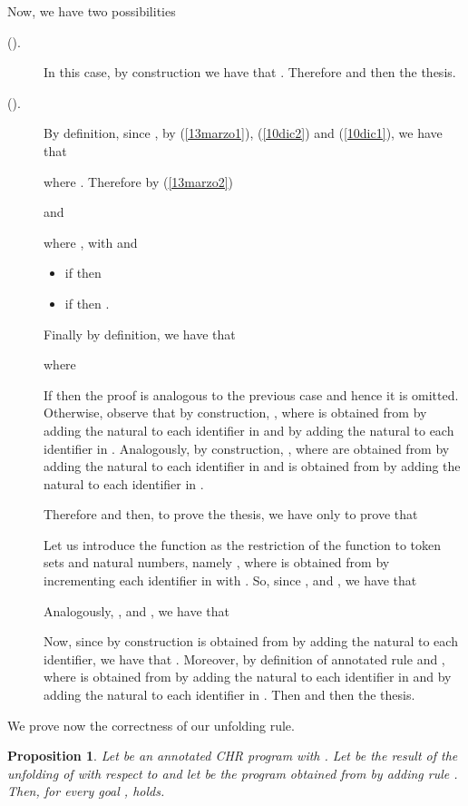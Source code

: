 \documentclass[final]{acmtrans2e}
\newtheorem{proposition}[theorem]{Proposition}
\begin{document}
Now, we have two possibilities
\begin{description}
  \item[().] In this case, by construction we have that . Therefore  and then the thesis.
  \item[().]
  By definition, since
, by (\ref{13marzo1}), (\ref{10dic2}) and (\ref{10dic1}), we have that

where . Therefore
by (\ref{13marzo2})


and

     where
     , with
      and
\begin{itemize}
    \item if  then 
    \item if  then .
    \end{itemize}
    Finally by definition, we have that

  where
  

  If  then the proof is analogous to the previous case and hence it is omitted.
  Otherwise, observe that by construction,
, where
 is obtained from  by adding the natural  to each identifier in
 and by adding the natural  to each identifier in
.
Analogously, by construction,
, where
  are obtained from  by adding the natural  to each identifier in
 and  is obtained from  by adding the natural   to each identifier in .

Therefore  and then, to prove the thesis, we have only to prove that 

Let us introduce the function  as
the restriction of the function  to token sets and natural numbers, namely
, where  is obtained from  by
incrementing each identifier in  with . So, since
,
 and
, we have that


Analogously, ,
 and , we have that

Now, since by construction  is obtained from  by adding the natural  to each identifier, we have that .
Moreover, by definition of annotated rule 
and , where
 is obtained from  by adding the natural  to each identifier in
 and by adding the natural  to each identifier in
. Then  and then the thesis.
\end{description}
\noindent{}



We prove now the correctness of our unfolding rule.

\begin{proposition}\label{lemma:equality}
Let  be an annotated CHR program with . Let   be the result
of the unfolding of  with respect to  and let  be the program
obtained from  by adding rule . Then, for every goal ,
 holds.
\end{proposition}
\end{document}
